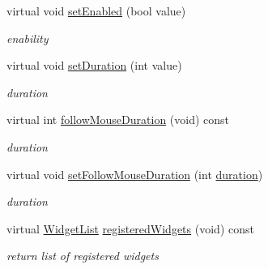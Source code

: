 \begin{DoxyCompactItemize}
virtual void \hyperlink{class_menu_bar_engine_v2_a44d0b1e4a7de16f0060d0dd189695312}{set\+Enabled} (bool value)
\begin{DoxyCompactList}\small\item\em enability \end{DoxyCompactList}\item 
\mbox{\label{class_menu_bar_engine_v2_ab02650b59eb9128d380a2538d9e40b1b}} 
virtual void \hyperlink{class_menu_bar_engine_v2_ab02650b59eb9128d380a2538d9e40b1b}{set\+Duration} (int value)
\begin{DoxyCompactList}\small\item\em duration \end{DoxyCompactList}\item 
\mbox{\label{class_menu_bar_engine_v2_a1ef8aaaef88d971ab616c6e582437403}} 
virtual int \hyperlink{class_menu_bar_engine_v2_a1ef8aaaef88d971ab616c6e582437403}{follow\+Mouse\+Duration} (void) const
\begin{DoxyCompactList}\small\item\em duration \end{DoxyCompactList}\item 
\mbox{\label{class_menu_bar_engine_v2_a99f512d73c85a51e988f85dce3271389}} 
virtual void \hyperlink{class_menu_bar_engine_v2_a99f512d73c85a51e988f85dce3271389}{set\+Follow\+Mouse\+Duration} (int \hyperlink{class_base_engine_a7edb8da9d2fd6cca19682d1d089dfa4b}{duration})
\begin{DoxyCompactList}\small\item\em duration \end{DoxyCompactList}\item 
\mbox{\label{class_menu_bar_engine_v2_a4ecbb8f89dba3d5924fd9ea79a9b2bdd}} 
virtual \hyperlink{class_base_engine_a2b0faec98a7eb68c91b502459c46a9c7}{Widget\+List} \hyperlink{class_menu_bar_engine_v2_a4ecbb8f89dba3d5924fd9ea79a9b2bdd}{registered\+Widgets} (void) const
\begin{DoxyCompactList}\small\item\em return list of registered widgets \end{DoxyCompactList}\end{DoxyCompactItemize}

